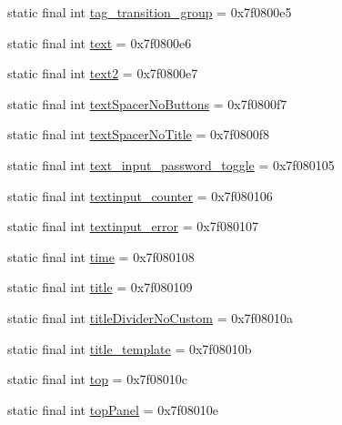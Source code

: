 \begin{DoxyCompactItemize}
\item 
static final int \mbox{\hyperlink{classandroid_1_1support_1_1design_1_1_r_1_1id_addf740e3527475a3849728232f72806a}{tag\+\_\+transition\+\_\+group}} = 0x7f0800e5
\item 
static final int \mbox{\hyperlink{classandroid_1_1support_1_1design_1_1_r_1_1id_a42faaf7f13a49213f874ef8cb4e68ee1}{text}} = 0x7f0800e6
\item 
static final int \mbox{\hyperlink{classandroid_1_1support_1_1design_1_1_r_1_1id_a65e945658c4131f7246b3447a632bccf}{text2}} = 0x7f0800e7
\item 
static final int \mbox{\hyperlink{classandroid_1_1support_1_1design_1_1_r_1_1id_a56c833c59cf9349be24f83f9e9dea560}{text\+Spacer\+No\+Buttons}} = 0x7f0800f7
\item 
static final int \mbox{\hyperlink{classandroid_1_1support_1_1design_1_1_r_1_1id_ac4df85eb99a5c88371d15995269b0cd6}{text\+Spacer\+No\+Title}} = 0x7f0800f8
\item 
static final int \mbox{\hyperlink{classandroid_1_1support_1_1design_1_1_r_1_1id_a77c3ac2414c276faa7936afbef217ab0}{text\+\_\+input\+\_\+password\+\_\+toggle}} = 0x7f080105
\item 
static final int \mbox{\hyperlink{classandroid_1_1support_1_1design_1_1_r_1_1id_a3e209a8a91205164870a6a2004def118}{textinput\+\_\+counter}} = 0x7f080106
\item 
static final int \mbox{\hyperlink{classandroid_1_1support_1_1design_1_1_r_1_1id_a2f78eeb6c053613a83de5e30874f4842}{textinput\+\_\+error}} = 0x7f080107
\item 
static final int \mbox{\hyperlink{classandroid_1_1support_1_1design_1_1_r_1_1id_ab05973571013eeb8a42479f708d42317}{time}} = 0x7f080108
\item 
static final int \mbox{\hyperlink{classandroid_1_1support_1_1design_1_1_r_1_1id_a15e74af9346f557351ae9e43a3ab4da1}{title}} = 0x7f080109
\item 
static final int \mbox{\hyperlink{classandroid_1_1support_1_1design_1_1_r_1_1id_a3685419c81ad5d66fb1cef37917b8008}{title\+Divider\+No\+Custom}} = 0x7f08010a
\item 
static final int \mbox{\hyperlink{classandroid_1_1support_1_1design_1_1_r_1_1id_a9a4ba99ff46ad16c6c732490f0740ffd}{title\+\_\+template}} = 0x7f08010b
\item 
static final int \mbox{\hyperlink{classandroid_1_1support_1_1design_1_1_r_1_1id_aa710ae6c7f9597ec94d2008d8a70b056}{top}} = 0x7f08010c
\item 
static final int \mbox{\hyperlink{classandroid_1_1support_1_1design_1_1_r_1_1id_a7eef3c87506e53208c3243360b38242c}{top\+Panel}} = 0x7f08010e

\end{DoxyCompactItemize}

